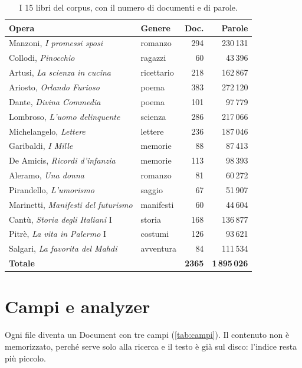 \documentclass[10pt,a4paper,twocolumn]{article}
\newcommand{\cls}[1]{\textsf{#1}}
\begin{document}
\begin{table}[t]
\centering\footnotesize
\caption{I 15 libri del corpus, con il numero di documenti e di parole.}
\label{tab:libri}
\setlength{\tabcolsep}{3.5pt}
\begin{tabularx}{\columnwidth}{@{}Xlrr@{}}
\toprule
\textbf{Opera} & \textbf{Genere} & \textbf{Doc.} & \textbf{Parole} \\
\midrule
Manzoni, \emph{I promessi sposi}            & romanzo   & 294 & 230\,131 \\
Collodi, \emph{Pinocchio}                   & ragazzi   &  60 &  43\,396 \\
Artusi, \emph{La scienza in cucina}         & ricettario& 218 & 162\,867 \\
Ariosto, \emph{Orlando Furioso}             & poema     & 383 & 272\,120 \\
Dante, \emph{Divina Commedia}               & poema     & 101 &  97\,779 \\
Lombroso, \emph{L'uomo delinquente}         & scienza   & 286 & 217\,066 \\
Michelangelo, \emph{Lettere}                & lettere   & 236 & 187\,046 \\
Garibaldi, \emph{I Mille}                   & memorie   &  88 &  87\,413 \\
De Amicis, \emph{Ricordi d'infanzia}        & memorie   & 113 &  98\,393 \\
Aleramo, \emph{Una donna}                   & romanzo   &  81 &  60\,272 \\
Pirandello, \emph{L'umorismo}               & saggio    &  67 &  51\,907 \\
Marinetti, \emph{Manifesti del futurismo}   & manifesti &  60 &  44\,604 \\
Cantù, \emph{Storia degli Italiani} I       & storia    & 168 & 136\,877 \\
Pitrè, \emph{La vita in Palermo} I          & costumi   & 126 &  93\,621 \\
Salgari, \emph{La favorita del Mahdi}       & avventura &  84 & 111\,534 \\
\midrule
\textbf{Totale}                             &           & \textbf{2365} & \textbf{1\,895\,026} \\
\bottomrule
\end{tabularx}
\end{table}

\section{Campi e analyzer}
Ogni file diventa un \cls{Document} con tre campi (\cref{tab:campi}). Il contenuto non è memorizzato,
perché serve solo alla ricerca e il testo è già sul disco: l'indice resta più piccolo.
\end{document}

